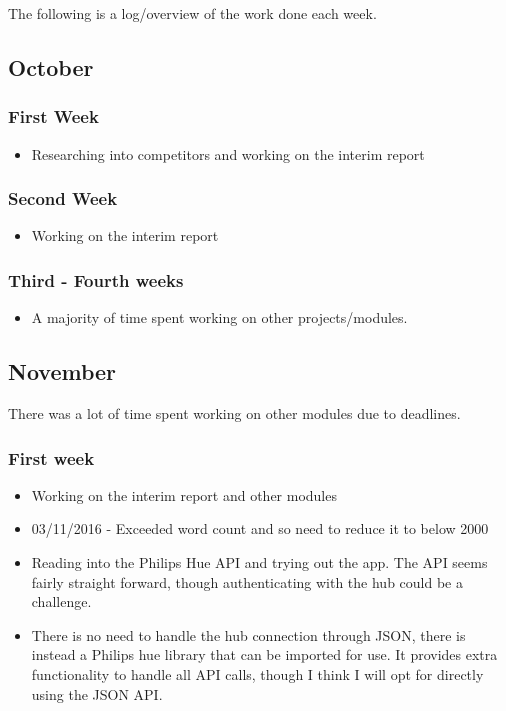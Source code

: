 The following is a log/overview of the work done each week.

\subsection{October}\label{october}

\subsubsection{First Week}\label{first-week}

\begin{itemize}
\tightlist
\item
  Researching into competitors and working on the interim report
\end{itemize}

\subsubsection{Second Week}\label{second-week}

\begin{itemize}
\tightlist
\item
  Working on the interim report
\end{itemize}

\subsubsection{Third - Fourth weeks}\label{third---fourth-weeks}

\begin{itemize}
\tightlist
\item
  A majority of time spent working on other projects/modules.
\end{itemize}

\subsection{November}\label{november}

There was a lot of time spent working on other modules due to deadlines.

\subsubsection{First week}\label{first-week-1}

\begin{itemize}
\tightlist
\item
  Working on the interim report and other modules
\item
  03/11/2016 - Exceeded word count and so need to reduce it to below
  2000
\item
  Reading into the Philips Hue API and trying out the app. The API seems
  fairly straight forward, though authenticating with the hub could be a
  challenge.
\item
  There is no need to handle the hub connection through JSON, there is
  instead a Philips hue library that can be imported for use. It
  provides extra functionality to handle all API calls, though I think I
  will opt for directly using the JSON API.
\end{itemize}

